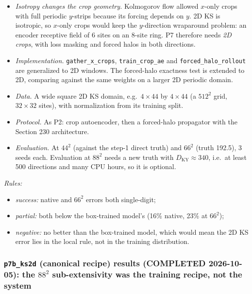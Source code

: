 \documentclass[11pt]{article}
\begin{document}
\begin{itemize}[leftmargin=*]
\item \emph{Isotropy changes the crop geometry.} Kolmogorov flow allowed
  $x$-only crops with full periodic $y$-strips because its forcing
  depends on $y$. 2D KS is isotropic, so $x$-only crops would keep the
  $y$-direction wraparound problem: an encoder receptive field of 6 sites
  on an 8-site ring. P7 therefore needs \emph{2D crops}, with loss
  masking and forced halos in both directions.
\item \emph{Implementation.} \texttt{gather\_x\_crops},
  \texttt{train\_crop\_ae} and \texttt{forced\_halo\_rollout} are
  generalized to 2D windows. The forced-halo exactness test is extended
  to 2D, comparing against the same weights on a larger 2D periodic
  domain.
\item \emph{Data.} A wide square 2D KS domain, e.g.\ $4\times44$ by
  $4\times44$ (a $512^2$ grid, $32\times32$ sites), with normalization
  from its training split.
\item \emph{Protocol.} As P2: crop autoencoder, then a forced-halo
  propagator with the Section 230 architecture.
\item \emph{Evaluation.} At $44^2$ (against the step-1 direct truth) and
  $66^2$ (truth 192.5), 3 seeds each. Evaluation at $88^2$ needs a new
  truth with $D_{\mathrm{KY}}\approx340$, i.e.\ at least 500 directions
  and many CPU hours, so it is optional.
\end{itemize}
\emph{Rules:}
\begin{itemize}[leftmargin=*]
\item \emph{success:} native and $66^2$ errors both single-digit;
\item \emph{partial:} both below the box-trained model's (16\% native,
  23\% at $66^2$);
\item \emph{negative:} no better than the box-trained model, which would
  mean the 2D KS error lies in the local rule, not in the training
  distribution.
\end{itemize}

\subsubsection{\texttt{p7b\_ks2d} (canonical recipe) results (COMPLETED
2026-10-05): the $88^2$ sub-extensivity was the training recipe, not
the system}
\label{sec:p7b_results}
\end{document}
